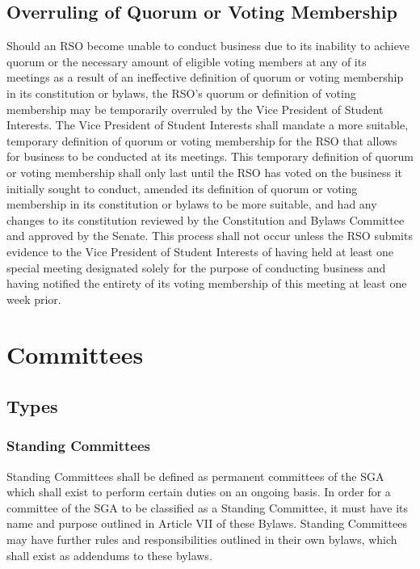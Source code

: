 \documentclass[12pt]{scrreprt}
\begin{document}
\section{Overruling of Quorum or Voting Membership}
Should an RSO become unable to conduct business due to its inability to achieve quorum or the necessary amount of eligible voting members at any of its meetings as a result of an ineffective definition of quorum or voting membership in its constitution or bylaws, the RSO’s quorum or definition of voting membership may be temporarily overruled by the Vice President of Student Interests. The Vice President of Student Interests shall mandate a more suitable, temporary definition of quorum or voting membership for the RSO that allows for business to be conducted at its meetings. This temporary definition of quorum or voting membership shall only last until the RSO has voted on the business it initially sought to conduct, amended its definition of quorum or voting membership in its constitution or bylaws to be more suitable, and had any changes to its constitution reviewed by the Constitution and Bylaws Committee and approved by the Senate. This process shall not occur unless the RSO submits evidence to the Vice President of Student Interests of having held at least one special meeting designated solely for the purpose of conducting business and having notified the entirety of its voting membership of this meeting at least one week prior.

\chapter{Committees}

\section{Types}

\subsection{Standing Committees}
Standing Committees shall be defined as permanent committees of the SGA which shall exist to perform certain duties on an ongoing basis. In order for a committee of the SGA to be classified as a Standing Committee, it must have its name and purpose outlined in Article VII of these Bylaws. Standing Committees may have further rules and responsibilities outlined in their own bylaws, which shall exist as addendums to these bylaws.
\end{document}
